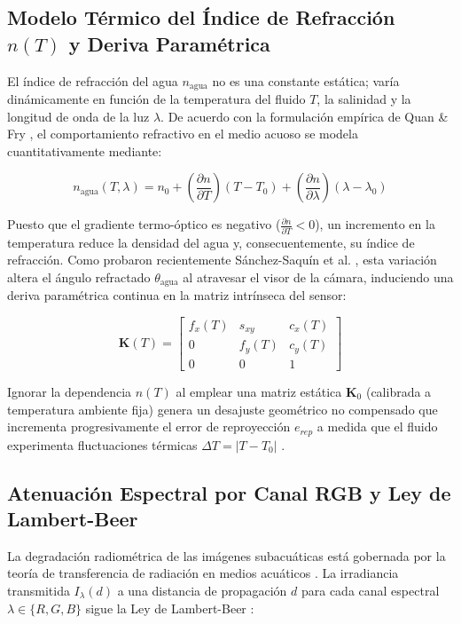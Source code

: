 \documentclass[12pt,letterpaper,spanish,twoside,openright]{report}
\begin{document}
\subsection{Modelo Térmico del Índice de Refracción $n(T)$ y Deriva Paramétrica}

El índice de refracción del agua $n_{\text{agua}}$ no es una constante estática; varía dinámicamente en función de la temperatura del fluido $T$, la salinidad y la longitud de onda de la luz $\lambda$. De acuerdo con la formulación empírica de Quan \& Fry \parencite{Quan1995}, el comportamiento refractivo en el medio acuoso se modela cuantitativamente mediante:

\begin{equation}
n_{\text{agua}}(T, \lambda) = n_0 + \left( \frac{\partial n}{\partial T} \right) (T - T_0) + \left( \frac{\partial n}{\partial \lambda} \right) (\lambda - \lambda_0)
\end{equation}

Puesto que el gradiente termo-óptico es negativo ($\frac{\partial n}{\partial T} < 0$), un incremento en la temperatura reduce la densidad del agua y, consecuentemente, su índice de refracción. Como probaron recientemente Sánchez-Saquín et al. \parencite{11176009}, esta variación altera el ángulo refractado $\theta_{\text{agua}}$ al atravesar el visor de la cámara, induciendo una deriva paramétrica continua en la matriz intrínseca del sensor:

\begin{equation}
\mathbf{K}(T) = \begin{bmatrix} f_x(T) & s_{xy} & c_x(T) \\ 0 & f_y(T) & c_y(T) \\ 0 & 0 & 1 \end{bmatrix}
\end{equation}

Ignorar la dependencia $n(T)$ al emplear una matriz estática $\mathbf{K}_0$ (calibrada a temperatura ambiente fija) genera un desajuste geométrico no compensado que incrementa progresivamente el error de reproyección $e_{rep}$ a medida que el fluido experimenta fluctuaciones térmicas $\Delta T = |T - T_0|$ \parencite{11176009}.

\subsection{Atenuación Espectral por Canal RGB y Ley de Lambert-Beer}

La degradación radiométrica de las imágenes subacuáticas está gobernada por la teoría de transferencia de radiación en medios acuáticos \parencite{Mobley1994}. La irradiancia transmitida $I_\lambda(d)$ a una distancia de propagación $d$ para cada canal espectral $\lambda \in \{R, G, B\}$ sigue la Ley de Lambert-Beer \parencite{10216333}:
\end{document}
